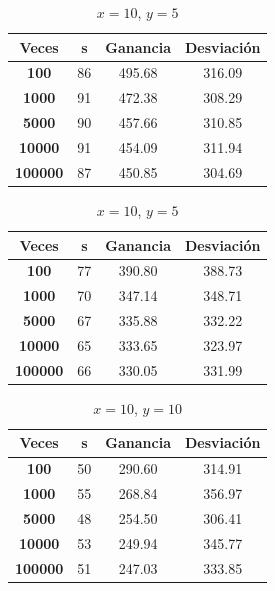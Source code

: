 \documentclass[11pt,a4paper]{report}
\begin{document}
\begin{table}[H]
	\parbox{.45\linewidth}{
	\centering
	\begin{tabular}{c|ccc}
	\textbf{Veces} & \textbf{s} & \textbf{Ganancia} & \textbf{Desviación} \\ \hline
	\textbf{100}   & 86         & 495.68            & 316.09			  \\ \hline
	\textbf{1000}  & 91         & 472.38            & 308.29			  \\ \hline
	\textbf{5000}  & 90         & 457.66            & 310.85 			  \\ \hline
	\textbf{10000} & 91         & 454.09            & 311.94			  \\ \hline
	\textbf{100000}& 87         & 450.85            & 304.69			  \\
	\end{tabular}
	\caption{$x=10$, $y=1$}
	}
	\hfill
	\parbox{.45\linewidth}{
	\centering
	\begin{tabular}{c|ccc}
	\textbf{Veces} & \textbf{s} & \textbf{Ganancia} & \textbf{Desviación} \\ \hline
	\textbf{100}   & 77         & 390.80            & 388.73			  \\ \hline
	\textbf{1000}  & 70         & 347.14            & 348.71			  \\ \hline
	\textbf{5000}  & 67         & 335.88            & 332.22 			  \\ \hline
	\textbf{10000} & 65         & 333.65            & 323.97			  \\ \hline
	\textbf{100000}& 66         & 330.05            & 331.99			  \\
	\end{tabular}
	\caption{$x=10$, $y=5$}
	}
\end{table}
\begin{table}[H]
	\centering
	\begin{tabular}{c|ccc}
	\textbf{Veces} & \textbf{s} & \textbf{Ganancia} & \textbf{Desviación} \\ \hline
	\textbf{100}   & 50         & 290.60            & 314.91			  \\ \hline
	\textbf{1000}  & 55         & 268.84            & 356.97			  \\ \hline
	\textbf{5000}  & 48         & 254.50            & 306.41 			  \\ \hline
	\textbf{10000} & 53         & 249.94            & 345.77			  \\ \hline
	\textbf{100000}& 51         & 247.03            & 333.85			  \\
	\end{tabular}
	\caption{$x=10$, $y=10$}
\end{table}
\end{document}
